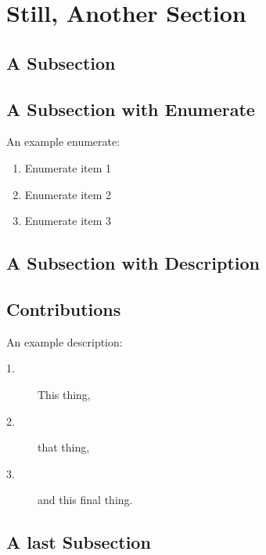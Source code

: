 \section{Still, Another Section}   \label{chap:ourModel}

\subsection{A Subsection}

\subsection{A Subsection with Enumerate}

An example enumerate:
\begin{enumerate}
    \item Enumerate item 1
    \item Enumerate item 2
    \item Enumerate item 3
\end{enumerate}

\subsection{A Subsection with Description}

\subsection{Contributions}
An example description:
\begin{description}
\item [1.] This thing,
\item [2.] that thing,
\item [3.] and this final thing.
\end{description}

\subsection{A last Subsection}
